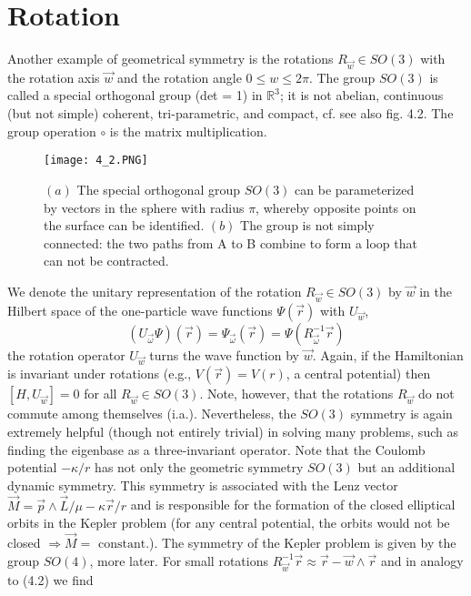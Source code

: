 \section{Rotation}
Another example of geometrical symmetry is the rotations $R_{\vec{w}} \in SO (3)$ with the rotation axis $\vec{w}$ and the rotation angle $0 \leq w \leq 2\pi$. The group $SO (3)$ is called a special orthogonal group (det = 1) in $\mathbb{R}^3$; it is not abelian, continuous (but not simple) coherent, tri-parametric, and compact, cf. see also fig. 4.2. The group operation $\circ$ is the matrix multiplication.
\begin{figure}[ht]
    \centering
    \texttt{[image: 4\_2.PNG]}
    \caption{$(a)$ The special orthogonal group $SO (3)$ can be parameterized by vectors in the sphere with radius $\pi$, whereby opposite points on the surface can be identified. $(b)$ The group is not simply connected: the two paths from A to B combine to form a loop that can not be contracted.}
\end{figure}
We denote the unitary representation of the rotation $R_{\vec{w}} \in SO (3)$ by $\vec{w}$ in the Hilbert space of the one-particle wave functions $\Psi (\vec{r})$ with $U_{\vec{w}}$,
\begin{equation}
    \left(U_{\vec{\omega}} \Psi\right)(\vec{r})=\Psi_{\vec{\omega}}(\vec{r})=\Psi\left(R_{\vec{\omega}}^{-1} \vec{r}\right)
    \end{equation}
the rotation operator $U _{\vec{w}}$ turns the wave function by $\vec{w}$. Again, if the Hamiltonian is invariant under rotations (e.g., $V (\vec{r}) = V (r)$, a central potential) then $[H, U_{\vec{w}}] = 0$ for all $R_{\vec{w}}\in SO (3)$. Note, however, that the rotations $R_{\vec{w}}$ do not commute among themselves (i.a.). Nevertheless, the $SO (3)$ symmetry is again extremely helpful (though not entirely trivial) in solving many problems, such as finding the eigenbase as a three-invariant operator. Note that the Coulomb potential $-\kappa / r$ has not only the geometric symmetry $SO (3)$ but an additional dynamic symmetry. This symmetry is associated with the Lenz vector $\vec{M} = \vec{p} \wedge \vec{L} / \mu - \kappa \vec{r} / r$ and is responsible for the formation of the closed elliptical orbits in the Kepler problem (for any central potential, the orbits would not be closed $\Rightarrow \vec{M} = \text{ constant}$.). The symmetry of the Kepler problem is given by the group $SO (4)$, more later. For small rotations $R_{\vec{w}}^{-1}\vec{r}\approx\vec{r}-\vec{w}\wedge\vec{r}$ and in analogy to (4.2) we find

